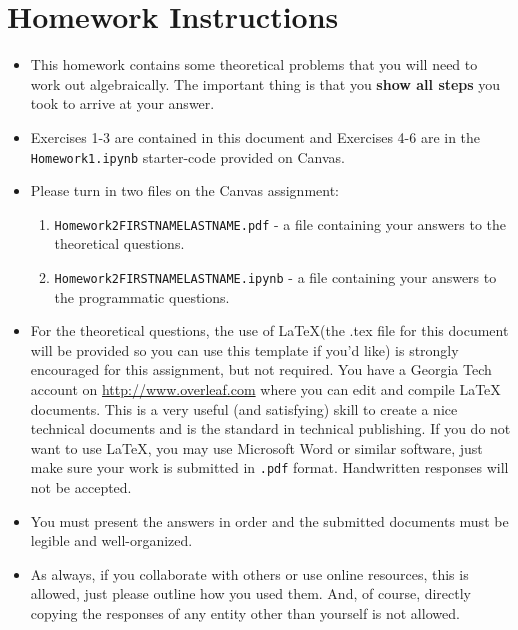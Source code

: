 \documentclass[12pt,letterpaper]{article}
\begin{document}
\section*{Homework Instructions}

\begin{itemize}
    \item This homework contains some theoretical problems that you will need to work out algebraically. The important thing is that you \textbf{show all steps} you took to arrive at your answer. 
    \item Exercises 1-3 are contained in this document and Exercises 4-6 are in the \texttt{Homework1.ipynb} starter-code provided on Canvas. 
    \item Please turn in two files on the Canvas assignment: 
    \begin{enumerate}
        \item \texttt{Homework2\textunderscore FIRSTNAME\textunderscore LASTNAME.pdf} - a file containing your answers to the theoretical questions. 
        \item \texttt{Homework2\textunderscore FIRSTNAME\textunderscore LASTNAME.ipynb} - a file containing your answers to the programmatic questions. 
    \end{enumerate}
    \item For the theoretical questions, the use of \LaTeX (the .tex file for this document will be provided so you can use this template if you'd like) is strongly encouraged for this assignment, but not required. You have a Georgia Tech account on \url{http://www.overleaf.com} where you can edit and compile LaTeX documents. This is a very useful (and satisfying) skill to create a nice technical documents and is the standard in technical publishing. If you do not want to use \LaTeX, you may use Microsoft Word or similar software, just make sure your work is submitted in \texttt{.pdf} format. Handwritten responses will not be accepted. 

    \item You must present the answers in order and the submitted documents must be legible and well-organized. 

    \item As always, if you collaborate with others or use online resources, this is allowed, just please outline how you used them. And, of course, directly copying the responses of any entity other than yourself is not allowed. 
\end{itemize}
\end{document}
